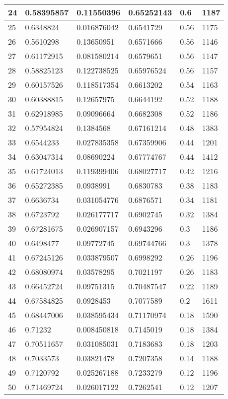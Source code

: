 \begin{longtable}{|l|l|l|l|l|l|}
24 & 0.58395857 & 0.11550396 & 0.65252143 & 0.6 & 1187 \\ \hline 
25 & 0.6348824 & 0.016876042 & 0.6541729 & 0.56 & 1175 \\ \hline 
26 & 0.5610298 & 0.13650951 & 0.6571666 & 0.56 & 1146 \\ \hline 
27 & 0.61172915 & 0.081580214 & 0.6579651 & 0.56 & 1147 \\ \hline 
28 & 0.58825123 & 0.122738525 & 0.65976524 & 0.56 & 1157 \\ \hline 
29 & 0.60157526 & 0.118517354 & 0.6613202 & 0.54 & 1163 \\ \hline 
30 & 0.60388815 & 0.12657975 & 0.6644192 & 0.52 & 1188 \\ \hline 
31 & 0.62918985 & 0.09096664 & 0.6682308 & 0.52 & 1186 \\ \hline 
32 & 0.57954824 & 0.1384568 & 0.67161214 & 0.48 & 1383 \\ \hline 
33 & 0.6544233 & 0.027835358 & 0.67359906 & 0.44 & 1201 \\ \hline 
34 & 0.63047314 & 0.08690224 & 0.67774767 & 0.44 & 1412 \\ \hline 
35 & 0.61724013 & 0.119399406 & 0.68027717 & 0.42 & 1216 \\ \hline 
36 & 0.65272385 & 0.0938991 & 0.6830783 & 0.38 & 1183 \\ \hline 
37 & 0.6636734 & 0.031054776 & 0.6876571 & 0.34 & 1181 \\ \hline 
38 & 0.6723792 & 0.026177717 & 0.6902745 & 0.32 & 1384 \\ \hline 
39 & 0.67281675 & 0.026907157 & 0.6943296 & 0.3 & 1186 \\ \hline 
40 & 0.6498477 & 0.09772745 & 0.69744766 & 0.3 & 1378 \\ \hline 
41 & 0.67245126 & 0.033879507 & 0.6998292 & 0.26 & 1196 \\ \hline 
42 & 0.68080974 & 0.03578295 & 0.7021197 & 0.26 & 1183 \\ \hline 
43 & 0.66452724 & 0.09751315 & 0.70487547 & 0.22 & 1189 \\ \hline 
44 & 0.67584825 & 0.0928453 & 0.7077589 & 0.2 & 1611 \\ \hline 
45 & 0.68447006 & 0.038595434 & 0.71170974 & 0.18 & 1590 \\ \hline 
46 & 0.71232 & 0.008450818 & 0.7145019 & 0.18 & 1384 \\ \hline 
47 & 0.70511657 & 0.031085031 & 0.7183683 & 0.18 & 1203 \\ \hline 
48 & 0.7033573 & 0.03821478 & 0.7207358 & 0.14 & 1188 \\ \hline 
49 & 0.7120792 & 0.025267188 & 0.7233279 & 0.12 & 1196 \\ \hline 
50 & 0.71469724 & 0.026017122 & 0.7262541 & 0.12 & 1207 \\ \hline 
\end{longtable}